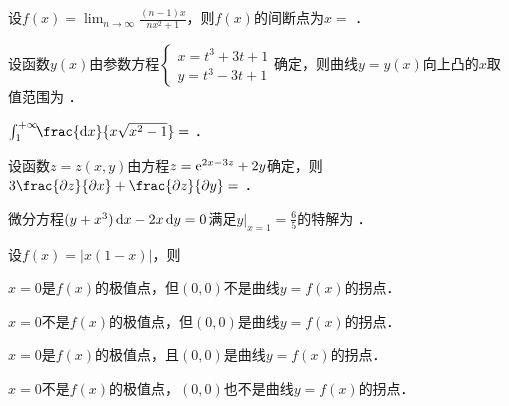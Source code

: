 \documentclass[plain,noanswer,medmath]{../../template/jnuexam}
\begin{document}






\begin{problem}
设$f(x) = \lim_{n \to \infty} \frac{(n - 1)x}{nx^2 + 1}$，则$f(x)$的间断点为$x =$ \fillin{}．
\end{problem}


\begin{problem}
设函数$y(x)$由参数方程$\begin{cases}
  x = t^3 + 3t + 1 \\
  y = t^3 - 3t + 1
\end{cases}$确定，则曲线$y = y(x)$向上凸的$x$取值范围为 \fillin{}．
\end{problem}


\begin{problem}
$\int_{1}^{+\infty}\!\!\frac{\dx}{x\sqrt{x^2 - 1}}=$ \fillin{}．
\end{problem}


\begin{problem}
设函数$z = z(x,y)$由方程$z = \mathrm{e}^{2x - 3z} + 2y$确定，则$3\frac{\pdz}{\pdx} + \frac{\pdz}{\pdy} =$ \fillin{}．
\end{problem}


\begin{problem}
微分方程$(y + x^3)\mathop{}\!\mathrm{d} x - 2x\mathop{}\!\mathrm{d} y = 0$满足$\left. y \right|_{x = 1} = \frac{6}{5}$的特解为 \fillin{}．
\end{problem}








\begin{problem}
设$f(x) = |x(1 - x)|$，则\pickout{}
\begin{abcd}
\item $x = 0$是$f(x)$的极值点，但$(0,0)$不是曲线$y = f(x)$的拐点．
\item $x = 0$不是$f(x)$的极值点，但$(0,0)$是曲线$y = f(x)$的拐点．
\item $x = 0$是$f(x)$的极值点，且$(0,0)$是曲线$y = f(x)$的拐点．
\item $x = 0$不是$f(x)$的极值点，$(0,0)$也不是曲线$y = f(x)$的拐点．
\end{abcd}
\end{problem}
\end{document}

